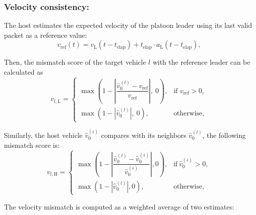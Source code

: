 \subsubsection{Velocity consistency:}
The host estimates the expected velocity of the platoon leader using its last valid packet as a reference value:
\begin{equation}
    v_{\text{ref}}(t) = {v}_{\text{L}}(t-t_{\text{elap}}) + t_{\text{elap}} \cdot {a}_{\text{L}}(t-t_{\text{elap}}), 
\end{equation}

Then, the mismatch score of the target vehicle $l$ with the reference leader can be calculated as
\begin{equation}
    v_{l,\text{L}} = 
        \begin{cases} 
            \max\left(1 - \left|\dfrac{\hat{v}_{0}^{(l)} - v_{\text{ref}}}{v_{\text{ref}}}\right|,\  0\right), & \text{if } v_\text{ref} > 0, \\
            \max\left(1 - | \hat{v}_{0}^{(l)}|,\  0\right), & \text{otherwise},
        \end{cases}
\end{equation}

Similarly, the host vehicle $\hat{v}_{0}^{(i)}$ compares with its neighbors $\hat{v}_{0}^{(l)}$, the following mismatch score is:
\begin{equation}
    v_{l,\text{H}} = 
        \begin{cases} 
            \max\left(1 - \left|\dfrac{\hat{v}_{0}^{(l)} - \hat{v}_{0}^{(i)}}{\hat{v}_{0}^{(i)}}\right|,  0\right), & \text{if} \  \hat{v}_{0}^{(i)} > 0, \\
            \max\left(1 - |\hat{v}_{0}^{(l)}|,  0\right), & \text{otherwise},
        \end{cases}
\end{equation}



The velocity mismatch is computed as a weighted average of two estimates:

